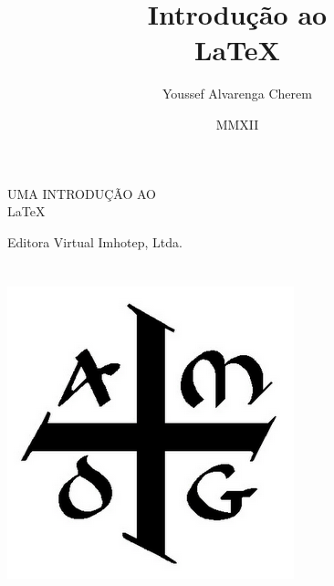 \documentclass[a4paper,nols,bidi,nohyper,nobib]{tufte-book}
\title{Introdução ao \\LaTeX}
\author{Youssef Alvarenga Cherem}
\date{MMXII}
\begin{document}

\frenchspacing

\frontmatter


\begin{titlepage}
\phantom{xxx}
\vfill
\centering
\LARGE
UMA INTRODUÇÃO AO\\
\vspace{1cm}
\fontsize{70}{80}\selectfont\LaTeX\par
\centering
\vfill
\LARGE
Editora Virtual Imhotep, Ltda.
\end{titlepage}

\restoregeometry

\maketitle

\chapter*{}
\thispagestyle{empty}
\phantom{}
\vfill

\begin{fullwidth}
\begin{center}
\includegraphics[scale=0.2]{amdg}\\
\end{center}
\end{fullwidth}
\end{document}

